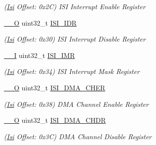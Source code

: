 \begin{DoxyCompactItemize}
\begin{DoxyCompactList}\small\item\em (\mbox{\hyperlink{structIsi}{Isi}} Offset\+: 0x2C) I\+SI Interrupt Enable Register \end{DoxyCompactList}\item 
\mbox{\label{structIsi_a7394179703802382dbb33e1ea8d25b7a}} 
\mbox{\hyperlink{core__cm7_8h_a7e25d9380f9ef903923964322e71f2f6}{\+\_\+\+\_\+O}} uint32\+\_\+t \mbox{\hyperlink{structIsi_a7394179703802382dbb33e1ea8d25b7a}{I\+S\+I\+\_\+\+I\+DR}}
\begin{DoxyCompactList}\small\item\em (\mbox{\hyperlink{structIsi}{Isi}} Offset\+: 0x30) I\+SI Interrupt Disable Register \end{DoxyCompactList}\item 
\mbox{\label{structIsi_a15225f0f2b5ade268f944c8f3f05ccd6}} 
\mbox{\hyperlink{core__cm7_8h_af63697ed9952cc71e1225efe205f6cd3}{\+\_\+\+\_\+I}} uint32\+\_\+t \mbox{\hyperlink{structIsi_a15225f0f2b5ade268f944c8f3f05ccd6}{I\+S\+I\+\_\+\+I\+MR}}
\begin{DoxyCompactList}\small\item\em (\mbox{\hyperlink{structIsi}{Isi}} Offset\+: 0x34) I\+SI Interrupt Mask Register \end{DoxyCompactList}\item 
\mbox{\label{structIsi_a6a4e9da5154376cf67caa44a09c15339}} 
\mbox{\hyperlink{core__cm7_8h_a7e25d9380f9ef903923964322e71f2f6}{\+\_\+\+\_\+O}} uint32\+\_\+t \mbox{\hyperlink{structIsi_a6a4e9da5154376cf67caa44a09c15339}{I\+S\+I\+\_\+\+D\+M\+A\+\_\+\+C\+H\+ER}}
\begin{DoxyCompactList}\small\item\em (\mbox{\hyperlink{structIsi}{Isi}} Offset\+: 0x38) D\+MA Channel Enable Register \end{DoxyCompactList}\item 
\mbox{\label{structIsi_a084cdbd6b9fef58226453f6bcbb70188}} 
\mbox{\hyperlink{core__cm7_8h_a7e25d9380f9ef903923964322e71f2f6}{\+\_\+\+\_\+O}} uint32\+\_\+t \mbox{\hyperlink{structIsi_a084cdbd6b9fef58226453f6bcbb70188}{I\+S\+I\+\_\+\+D\+M\+A\+\_\+\+C\+H\+DR}}
\begin{DoxyCompactList}\small\item\em (\mbox{\hyperlink{structIsi}{Isi}} Offset\+: 0x3C) D\+MA Channel Disable Register \end{DoxyCompactList}\item 

\end{DoxyCompactItemize}
